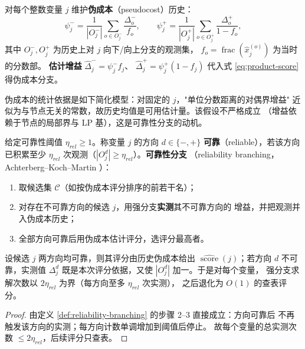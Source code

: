 \begin{definition}[伪成本]
\label{def:pseudocost}
对每个整数变量 $j$ 维护\textbf{伪成本}（pseudocost）历史：
\begin{equation}
\label{eq:pseudocost}
\psi_j^- = \frac{1}{|O_j^-|}\sum_{o \in O_j^-}
\frac{\Delta_o^-}{f_o}, \qquad
\psi_j^+ = \frac{1}{|O_j^+|}\sum_{o \in O_j^+}
\frac{\Delta_o^+}{1 - f_o},
\end{equation}
其中 $O_j^-, O_j^+$ 为历史上对 $j$ 向下/向上分支的观测集，
$f_o = \operatorname{frac}(\hat x_j^{(o)})$ 为当时的分数部。
\textbf{估计增益} $\widehat\Delta_j^- = \psi_j^- f_j$、
$\widehat\Delta_j^+ = \psi_j^+ (1 - f_j)$ 代入式 \eqref{eq:product-score}
得伪成本分支。
\end{definition}

伪成本的统计依据是如下简化模型：对固定的 $j$，"单位分数距离的对偶界增益"
近似为与节点无关的常数，故历史均值是可用估计量。该假设不严格成立
（增益依赖于节点的局部界与 LP 基），这是可靠性分支的动机。

\begin{definition}[可靠性分支]
\label{def:reliability-branching}
给定可靠性阈值 $\eta_{rel} \ge 1$。称变量 $j$ 的方向
$d \in \{-, +\}$ \textbf{可靠}（reliable），若该方向已积累至少
$\eta_{rel}$ 次观测（$|O_j^d| \ge \eta_{rel}$）。\textbf{可靠性分支}
（reliability branching，Achterberg--Koch--Martin \cite{achterberg2005}）：
\begin{enumerate}
  \item 取候选集 $\mathcal{C}$（如按伪成本评分排序的前若干名）；
  \item 对存在不可靠方向的候选 $j$，用强分支\textbf{实测}其不可靠方向的
        增益，并把观测并入伪成本历史；
  \item 全部方向可靠后用伪成本估计评分，选评分最高者。
\end{enumerate}
\end{definition}

\begin{proposition}[可靠性分支的估计结构]
\label{prop:reliability}
设候选 $j$ 两方向均可靠，则其评分由历史伪成本给出
$\widehat{\operatorname{score}}(j)$；若方向 $d$ 不可靠，实测值
$\Delta_j^d$ 既是本次评分依据，又使 $|O_j^d|$ 加一。于是对每个变量，
强分支求解次数以 $2\eta_{rel}$ 为界（每方向至多 $\eta_{rel}$ 次实测），
之后退化为 $O(1)$ 的查表评分。
\end{proposition}
\begin{proof}
由定义 \ref{def:reliability-branching} 的步骤 2--3 直接成立：方向可靠后
不再触发该方向的实测；每方向计数单调增加到阈值后停止。
故每个变量的总实测次数 $\le 2\eta_{rel}$，后续评分只查表。
\end{proof}


